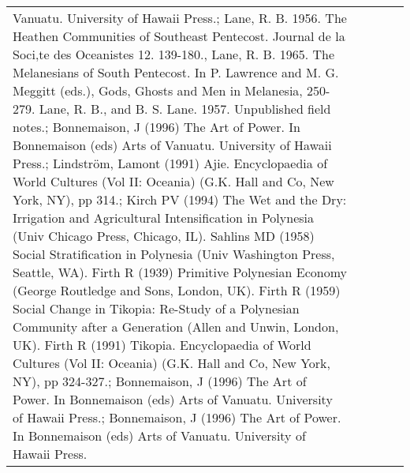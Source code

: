\begin{longtable}{p{2cm}p{2cm}p{2cm}p{5cm}p{7cm}}
Vanuatu. University of Hawaii Press.; Lane, R. B. 1956. The Heathen Communities of Southeast Pentecost. Journal de la Soci‚te des Oceanistes 12. 139-180., Lane, R. B. 1965. The Melanesians of South Pentecost. In P. Lawrence and M. G. Meggitt (eds.), Gods, Ghosts and Men in Melanesia, 250-279. Lane, R. B., and B. S. Lane. 1957. Unpublished field notes.; Bonnemaison, J (1996) The Art of Power. In Bonnemaison (eds) Arts of Vanuatu. University of Hawaii Press.; Lindström, Lamont (1991) Ajie. Encyclopaedia of World Cultures (Vol II: Oceania) (G.K. Hall and Co, New York, NY), pp 314.; Kirch PV (1994) The Wet and the Dry: Irrigation and Agricultural Intensification in Polynesia (Univ Chicago Press, Chicago, IL). Sahlins MD (1958) Social Stratification in Polynesia (Univ Washington Press, Seattle, WA). Firth R (1939) Primitive Polynesian Economy (George Routledge and Sons, London, UK). Firth R (1959) Social Change in Tikopia: Re-Study of a Polynesian Community after a Generation (Allen and Unwin, London, UK). Firth R (1991) Tikopia. Encyclopaedia of World Cultures (Vol II: Oceania) (G.K. Hall and Co, New York, NY), pp 324-327.; Bonnemaison, J (1996) The Art of Power. In Bonnemaison (eds) Arts of Vanuatu. University of Hawaii Press.; Bonnemaison, J (1996) The Art of Power. In Bonnemaison (eds) Arts of Vanuatu. University of Hawaii Press. \\ 

\end{longtable}
